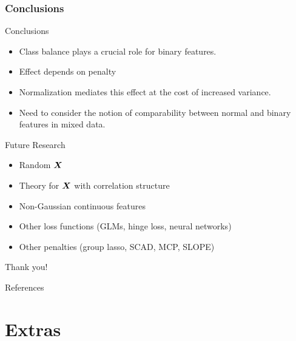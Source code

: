 \documentclass[10pt]{beamer}
\begin{document}
\begin{frame}[c]
  \frametitle{Conclusions}
  \begin{exampleblock}{Conclusions}
    \begin{itemize}
      \item Class balance plays a crucial role for binary features.
      \item Effect depends on penalty
      \item Normalization mediates this effect at the cost of increased variance.
      \item Need to consider the notion of comparability between normal and binary features in mixed data.
    \end{itemize}
  \end{exampleblock}

  \pause

  \begin{alertblock}{Future Research}
    \begin{itemize}
      \item Random \(\boldsymbol{X}\)
      \item Theory for \(\boldsymbol{X}\) with correlation structure
      \item Non-Gaussian continuous features
      \item Other loss functions (GLMs, hinge loss, neural networks)
      \item Other penalties (group lasso, SCAD, MCP, SLOPE)
    \end{itemize}
  \end{alertblock}
\end{frame}

\begin{frame}[standout]
  Thank you!
\end{frame}

\appendix

\begin{frame}[allowframebreaks]{References}
  \printbibliography[heading=none]
\end{frame}

\section{Extras}
\end{document}
